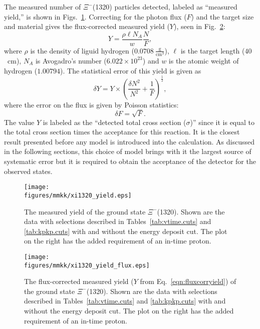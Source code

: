 The measured number of $\Xi^-$(1320) particles detected, labeled as ``measured yield,'' is shown in Figs.~\ref{fig:xi1320.yield}. Correcting for the photon flux ($F$) and the target size and material gives the flux-corrected measured yield ($Y$), seen in Fig.~\ref{fig:xi1320.yieldflux}:
\begin{equation}
    Y = \frac{\rho \ell N_A}{w} \frac{N}{F},
    \label{eqn:fluxcorryield}
\end{equation}
where $\rho$ is the density of liguid hydrogen ($0.0708~\frac{\mathrm{g}}{\mathrm{cm}^3}$), $\ell$ is the target length ($40$~cm), $N_A$ is Avogadro's number ($6.022\times10^{23}$) and $w$ is the atomic weight of hydrogen ($1.00794$). The statistical error of this yield is given as
\begin{equation}
    \delta Y = Y \times \left(
        \frac{\delta N^2}{N^2} + \frac{1}{F}
        \right)^\frac{1}{2},
    \label{eqn:fluxcorryield.err}
\end{equation}
where the error on the flux is given by Poisson statistics:
\begin{equation}
    \delta F = \sqrt{F}.
\end{equation}
The value $Y$ is labeled as the ``detected total cross section ($\sigma$)'' since it is equal to the total cross section times the acceptance for this reaction. It is the closest result presented before any model is introduced into the calculation. As discussed in the following sections, this choice of model brings with it the largest source of systematic error but it is required to obtain the acceptance of the detector for the observed states.

\begin{figure}[bh]\centering
    \texttt{[image: \\figures/mmkk/xi1320\_yield.eps]}
    \caption[\texorpdfstring{$\Xi^-$}{Xi-}(1320) Measured Yield]{\label{fig:xi1320.yield}The measured yield of the ground state $\Xi^-$(1320). Shown are the data with selections described in Tables~\ref{tab:vtime.cuts} and \ref{tab:kpkp.cuts} with and without the  energy deposit cut. The plot on the right has the added requirement of an in-time proton.}
\end{figure}

\begin{figure}[bh]\centering
    \texttt{[image: \\figures/mmkk/xi1320\_yield\_flux.eps]}
    \caption[\texorpdfstring{$\Xi^-$}{Xi-}(1320) Measured Yield]{\label{fig:xi1320.yieldflux}The flux-corrected measured yield ($Y$ from Eq.~\ref{eqn:fluxcorryield}) of the ground state $\Xi^-$(1320). Shown are the data with selections described in Tables~\ref{tab:vtime.cuts} and \ref{tab:kpkp.cuts} with and without the  energy deposit cut. The plot on the right has the added requirement of an in-time proton.}
\end{figure}

\clearpage
